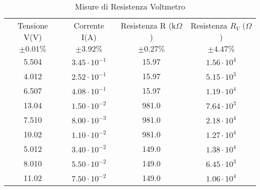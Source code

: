 \begin{table}[H]
    \centering
    \caption{Misure di Resistenza Voltmetro}
    \begin{tabular}{|c|c|c|c|}
    \hline
        Tensione V(V) & Corrente I(A) & Resistenza R (k$\Omega$) & Resistenza $R_V$ ($\Omega$) \\
        $\pm 0.01\%$ & $\pm 3.92 \%$ & $\pm 0.27 \%$ & $\pm 4.47 \%$\\
        \hline
        5.504   & $3.45 \cdot10^{-1}$  & 15.97  & $1.56 \cdot10^4$ \\
        4.012   & $2.52 \cdot10^{-1}$  & 15.97  & $5.15 \cdot10^3$ \\
        6.507   & $4.08 \cdot10^{-1}$  & 15.97  & $1.19 \cdot10^4$ \\
        13.04   & $1.50 \cdot10^{-2}$  & 981.0  & $7.64 \cdot10^3$ \\
        7.510   & $8.00 \cdot10^{-3}$  & 981.0  & $2.18 \cdot10^4$ \\
        10.02   & $1.10 \cdot10^{-2}$  & 981.0  & $1.27 \cdot10^4$ \\
        5.012   & $3.40 \cdot10^{-2}$  & 149.0  & $1.38 \cdot10^4$ \\
        8.010   & $5.50 \cdot10^{-2}$  & 149.0  & $6.45 \cdot10^3$ \\
        11.02   & $7.50 \cdot10^{-2}$  & 149.0  & $1.06 \cdot10^4$ \\
        \hline
    \end{tabular}
    \label{}
\end{table}